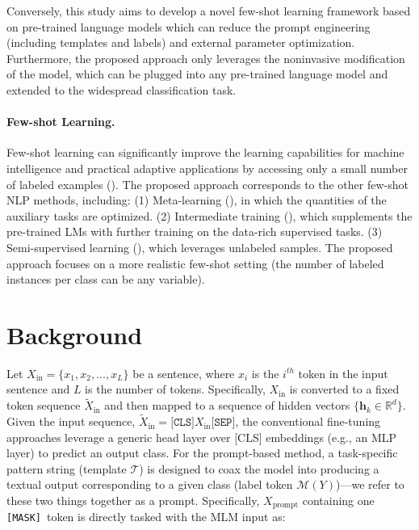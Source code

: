 \documentclass{article} \usepackage{iclr2022_conference,times}
\newcommand{\mf}[1]{\mathbf{#1}}
\newcommand{\xinput}{{X}_{\mathrm{in}}}
\newcommand{\xinputhat}{\tilde{X}_{\mathrm{in}}}
\newcommand{\xprompt}{{X}_{\mathrm{prompt}}}
\newcommand{\template}{\mathcal{T}}
\newcommand{\labelset}{Y}
\newcommand{\mapping}{\mathcal{M}}
\newcommand{\cls}{\texttt{[CLS]}}
\newcommand{\sep}{\texttt{[SEP]}}
\newcommand{\mask}{\texttt{[MASK]}}
\begin{document}
Conversely, this study aims to develop a novel few-shot learning framework based on pre-trained language models which can reduce the prompt engineering (including templates and labels) and external parameter optimization. 
Furthermore, the proposed approach only leverages the noninvasive modification of the model, which can be plugged into any pre-trained language model and extended to the widespread classification task. 

\paragraph{Few-shot Learning.}
Few-shot learning can significantly improve the learning capabilities for machine intelligence and practical adaptive applications by accessing only a small number of labeled examples (\cite{DBLP:conf/www/ZhangDSCZC20}). 
The proposed approach corresponds to the other few-shot NLP methods, including: 
(1) Meta-learning (\cite{DBLP:conf/naacl/YuGYCPCTWZ18,DBLP:conf/iclr/BaoWCB20,DBLP:conf/coling/BansalJM20,DBLP:conf/aaai/DengZSCC20,DBLP:conf/wsdm/DengZKZZC20,DBLP:conf/coling/YuZDYZC20}), in which the quantities of the auxiliary tasks are optimized. 
(2) Intermediate training (\cite{DBLP:journals/corr/abs-1811-01088,DBLP:conf/emnlp/YinRRSX20}), which supplements the pre-trained LMs with further training on the data-rich supervised tasks.
(3) Semi-supervised learning (\cite{DBLP:conf/iclr/MiyatoDG17,DBLP:conf/nips/XieDHL020}), which leverages unlabeled samples. 
The proposed approach focuses on a more realistic few-shot setting (the number of labeled instances per class can be any variable).

\section{Background}
Let $\xinput=\{x_1, x_2, ..., x_L\}$ be a sentence, where $x_i$ is the $i^{th}$ token in the input sentence and $L$ is the number of tokens. 
Specifically, $\xinput$ is converted to a fixed token sequence $\xinputhat$ and then mapped to a sequence of hidden vectors $\{\mf{h}_k \in \mathbb{R}^d\}$. 
Given the input sequence, $\xinputhat=\cls \xinput \sep$, the conventional fine-tuning approaches leverage a generic head layer over [CLS] embeddings (e.g., an MLP layer) to predict an output class. 
For the prompt-based method, a task-specific pattern string (template $\template$) is designed to coax the model into producing a textual output corresponding to a given class (label token $\mapping(\labelset)$)---we refer to these two things together as a prompt.
Specifically, $\xprompt$ containing one \mask~token is directly tasked with the MLM input as:
\end{document}
